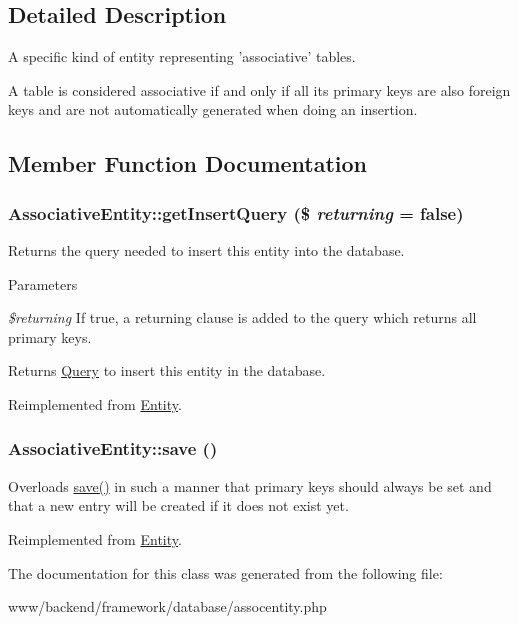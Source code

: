 \subsection{Detailed Description}
A specific kind of entity representing 'associative' tables.

A table is considered associative if and only if all its primary keys are also foreign keys and are not automatically generated when doing an insertion. 

\subsection{Member Function Documentation}
\hypertarget{classAssociativeEntity_a52105f0a9a643c01e92d6acc4dfafef3}{
\subsubsection[{getInsertQuery}]{\setlength{\rightskip}{0pt plus 5cm}AssociativeEntity::getInsertQuery (\$ {\em returning} = {\ttfamily false})}}
\label{classAssociativeEntity_a52105f0a9a643c01e92d6acc4dfafef3}
Returns the query needed to insert this entity into the database.


\begin{DoxyParams}{Parameters}
\item[{\em \$returning}]If true, a returning clause is added to the query which returns all primary keys.\end{DoxyParams}
\begin{DoxyReturn}{Returns}
\hyperlink{classQuery}{Query} to insert this entity in the database. 
\end{DoxyReturn}


Reimplemented from \hyperlink{classEntity_a48b7255175241170f98b9f2601243b48}{Entity}.

\hypertarget{classAssociativeEntity_a6a68659dda2caa94f624ac856933a90a}{
\subsubsection[{save}]{\setlength{\rightskip}{0pt plus 5cm}AssociativeEntity::save ()}}
\label{classAssociativeEntity_a6a68659dda2caa94f624ac856933a90a}
Overloads \hyperlink{classAssociativeEntity_a6a68659dda2caa94f624ac856933a90a}{save()} in such a manner that primary keys should always be set and that a new entry will be created if it does not exist yet. 

Reimplemented from \hyperlink{classEntity_af4822c7e840cf775ca98c2fce2d8de49}{Entity}.



The documentation for this class was generated from the following file:\begin{DoxyCompactItemize}
\item 
www/backend/framework/database/assocentity.php\end{DoxyCompactItemize}
